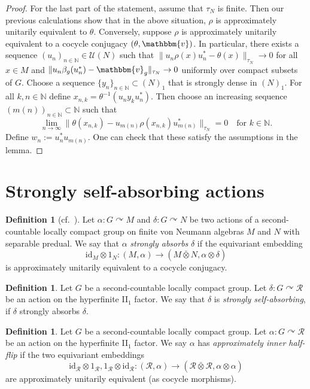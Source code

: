 \documentclass[11pt,a4paper]{article}
\theoremstyle{definition}
\newtheorem{definition}[theorem]{Definition}
\theoremstyle{remark}
\numberwithin{equation}{section}
\numberwithin{theorem}{section}
\newcommand{\N}{\mathbb{N}}
\newcommand{\acts}{\curvearrowright}
\begin{document}
\begin{proof}
For the last part of the statement, assume that $\tau_N$ is finite.
Then our previous calculations show that in the above situation, $\rho$ is approximately unitarily equivalent to $\theta$.
Conversely, suppose $\rho$ is approximately unitarily equivalent to a cocycle conjugacy $(\theta,\mathbbm{v})$.
In particular, there exists a sequence $(u_n)_{n \in \N} \in \mathcal{U}(N)$ such that $\|u_n\rho(x)u_n^* -  \theta(x)\|_{\tau_N} \rightarrow 0$ for all $x \in M$ and $\|u_n \beta_g(u_n^*) - \mathbbm{v}_g\|_{\tau_N} \rightarrow 0$ uniformly over compact subsets of $G$.
%
Choose a sequence $\{y_n\}_{n \in \N} \subset (N)_1$ that is strongly dense in $(N)_1$. For all $k,n \in \N$ define $x_{n,k} = \theta^{-1}(u_ny_ku_n^*)$. Then choose an increasing sequence $(m(n))_{n \in \N} \subset \N$ such that
 \begin{equation*}
 \lim_{n \rightarrow \infty} \| \theta(x_{n,k}) - u_{m(n)} \rho (x_{n,k}) u_{m(n)}^*\|_{\tau_N} = 0 \quad \text{for } k \in \N.\end{equation*}
Define $w_n := u_n^*u_{m(n)}$. One can check that these satisfy the assumptions in the lemma. 
\end{proof}

\section{Strongly self-absorbing actions}

\begin{definition}[cf.\ {\cite[Definition 5.1]{Szabo21cc}}] \label{def:strong-absorption}
Let $\alpha:G \acts M$ and $\delta\colon G \acts N$ be two actions of a second-countable locally compact group on finite von Neumann algebras $M$ and $N$ with separable predual.
We say that $\alpha$ \emph{strongly absorbs} $\delta$ if the equivariant embedding
\[\mathrm{id}_M \otimes 1_N\colon (M, \alpha) \rightarrow (M \bar{\otimes} N, \alpha \otimes \delta)\]
is approximately unitarily equivalent to a cocycle conjugacy.
\end{definition}

\begin{definition} \label{def:ssa-action}
Let $G$ be a second-countable locally compact group.
Let $\delta\colon G \acts \mathcal{R}$ be an action on the hyperfinite II$_1$ factor.
We say that $\delta$ is \emph{strongly self-absorbing}, if $\delta$ strongly absorbs $\delta$.
\end{definition}

\begin{definition}
Let $G$ be a second-countable locally compact group.
Let $\alpha\colon G \acts \mathcal{R}$ be an action on the hyperfinite II$_1$ factor.
We say $\alpha$ has \emph{approximately inner half-flip} if the two equivariant embeddings
\[
\mathrm{id}_\mathcal{R} \otimes 1_\mathcal{R}, 1_\mathcal{R} \otimes \mathrm{id}_\mathcal{R}\colon (\mathcal{R}, \alpha) \rightarrow (\mathcal{R} \bar{\otimes} \mathcal{R}, \alpha \otimes \alpha)
\]
are approximately unitarily equivalent (as cocycle morphisms).
\end{definition}
\end{document}
